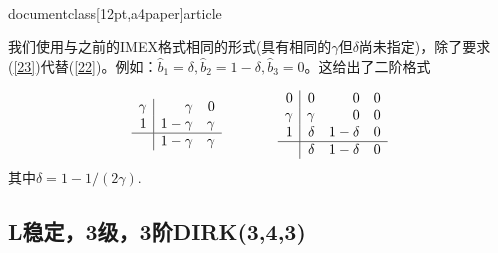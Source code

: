 \\documentclass[12pt,a4paper]{article}
\begin{document}
我们使用与之前的IMEX格式相同的形式(具有相同的$\gamma$但$\delta$尚未指定)，除了要求(\ref{23})代替(\ref{22})。例如：$\widehat{b}_{1}=\delta,\widehat{b}_{2}=1-\delta,\widehat{b}_{3}=0$。这给出了二阶格式

\[
\begin{array}{r|rr}
\gamma & \gamma & 0\\
1 & 1-\gamma & \gamma \\
\hline
&1-\gamma & \gamma 
\end{array}~~~~~~~~~~~~
\begin{array}{r|rrr}
0 & 0 & 0 & 0 \\
\gamma & \gamma & 0 & 0\\
1 & \delta & 1-\delta & 0\\
\hline
& \delta & 1-\delta & 0
\end{array}
\]
其中$\delta=1-1/(2\gamma)$.

\subsection{L稳定，3级，3阶DIRK(3,4,3)}
\end{document}
